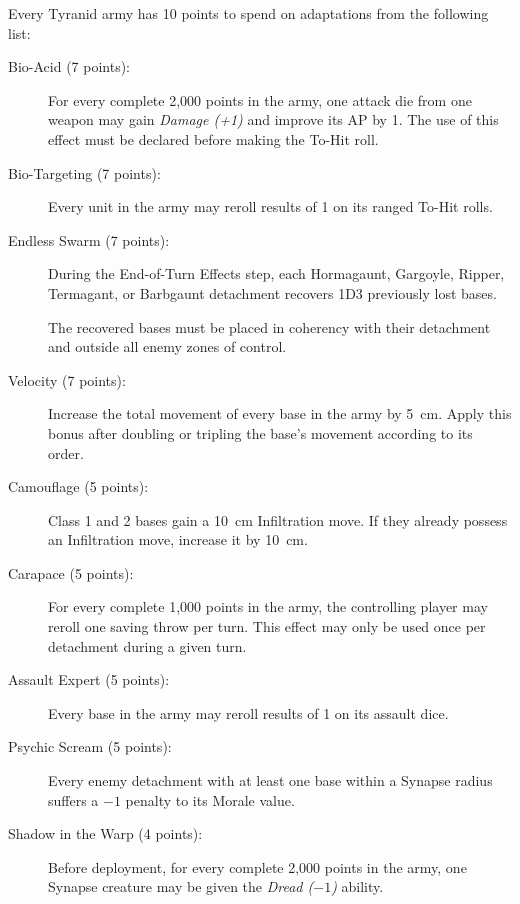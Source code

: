 Every Tyranid army has 10 points to spend on adaptations from the following list:

\begin{description}
    \item[Bio-Acid (7 points):]
    For every complete 2,000 points in the army, one attack die from one weapon may gain \textit{Damage (+1)} and improve its AP by 1. The use of this effect must be declared before making the To-Hit roll.

    \item[Bio-Targeting (7 points):]
    Every unit in the army may reroll results of 1 on its ranged To-Hit rolls.

    \item[Endless Swarm (7 points):]
    During the End-of-Turn Effects step, each Hormagaunt, Gargoyle, Ripper, Termagant, or Barbgaunt detachment recovers 1D3 previously lost bases.

    The recovered bases must be placed in coherency with their detachment and outside all enemy zones of control.

    \item[Velocity (7 points):]
    Increase the total movement of every base in the army by 5~cm. Apply this bonus after doubling or tripling the base's movement according to its order.

    \item[Camouflage (5 points):]
    Class 1 and 2 bases gain a 10~cm Infiltration move. If they already possess an Infiltration move, increase it by 10~cm.

    \item[Carapace (5 points):]
    For every complete 1,000 points in the army, the controlling player may reroll one saving throw per turn. This effect may only be used once per detachment during a given turn.

    \item[Assault Expert (5 points):]
    Every base in the army may reroll results of 1 on its assault dice.

    \item[Psychic Scream (5 points):]
    Every enemy detachment with at least one base within a Synapse radius suffers a $-1$ penalty to its Morale value.

    \item[Shadow in the Warp (4 points):]
    Before deployment, for every complete 2,000 points in the army, one Synapse creature may be given the \textit{Dread ($-1$)} ability.


\end{description}
